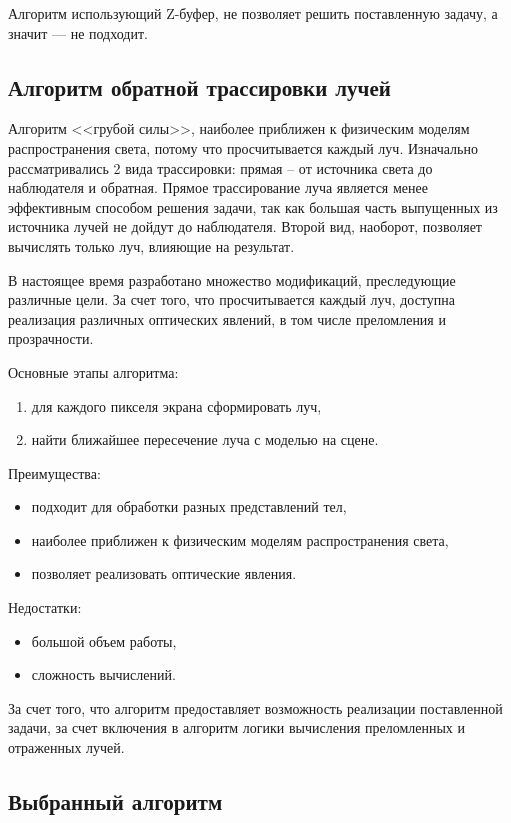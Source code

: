 Алгоритм использующий Z-буфер, не позволяет решить поставленную задачу, а значит --- не подходит.

\subsection{Алгоритм обратной трассировки лучей}

Алгоритм <<грубой силы>>, наиболее приближен к физическим моделям распространения света, потому что просчитывается каждый луч. 
Изначально рассматривались 2 вида трассировки: прямая -- от источника света до наблюдателя и обратная. 
Прямое трассирование луча является менее эффективным способом решения задачи, так как большая часть выпущенных из источника лучей не дойдут до наблюдателя. 
Второй вид, наоборот, позволяет вычислять только луч, влияющие на результат.

В настоящее время разработано множество модификаций, преследующие различные цели. За счет того, что просчитывается каждый луч, доступна реализация различных оптических явлений, в том числе преломления и прозрачности.


Основные этапы алгоритма:
\begin{enumerate}
	\item для каждого пикселя экрана сформировать луч,
	\item найти ближайшее пересечение луча с моделью на сцене.
\end{enumerate}

Преимущества:

\begin{itemize}
	\item подходит для обработки разных представлений тел,
	\item наиболее приближен к физическим моделям распространения света,
	\item позволяет реализовать оптические явления.
\end{itemize}

Недостатки:

\begin{itemize}
	\item большой объем работы,
	\item сложность вычислений.
\end{itemize}

За счет того, что алгоритм предоставляет возможность реализации поставленной задачи, за счет включения в алгоритм логики вычисления преломленных и отраженных лучей.


\subsection{Выбранный алгоритм}

